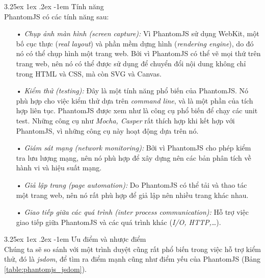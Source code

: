 \documentclass[12pt,a4paper,twoside]{article}
\makeatletter
\newcommand{\myparagraph}[1]{\paragraph{#1}\mbox{}\\} %
\renewcommand\paragraph{\@startsection{paragraph}{5}{\z@}%
  {3.25ex \@plus1ex \@minus.2ex}%
  {-1em}%
  {\normalfont\normalsize\bfseries}}
\makeatother
\begin{document}
\myparagraph{Tính năng}
PhantomJS có các tính năng sau:
\begin{itemize}
\item[•] \emph{Chụp ảnh màn hình (screen capture):} Vì PhantomJS sử dụng WebKit, một bố cục thực (\textit{real layout}) và phần mềm dựng hình (\textit{rendering engine}), do đó nó có thể chụp hình một trang web. Bởi vì PhantomJS có thể vẽ mọi thứ trên trang web, nên nó có thể được sử dụng để chuyển đổi nội dung không chỉ trong HTML và CSS, mà còn SVG và Canvas.
\item[•] \emph{Kiểm thử (testing):} Đây là một tính năng phổ biến của PhantomJS. Nó phù hợp cho việc kiểm thử dựa trên \textit{command line}, và là một phần của tích hợp liên tục. PhantomJS được xem như là công cụ phổ biến để chạy các unit test. Những công cụ như \textit{Mocha, Casper} rất thích hợp khi kết hợp với PhantomJS, vì những công cụ này hoạt động dựa trên nó.
\item[•] \emph{Giám sát mạng (network monitoring):} Bởi vì PhantomJS cho phép kiểm tra lưu lượng mạng, nên nó phù hợp để xây dựng nên các bản phân tích về hành vi và hiệu suất mạng.
\item[•] \emph{Giả lập trang (page automation):} Do PhantomJS có thể tải và thao tác một trang web, nên nó rất phù hợp để giả lập nên nhiều trang khác nhau.
\item[•] \emph{Giao tiếp giữa các quá trình (inter process communication):} Hỗ trợ việc giao tiếp giữa PhantomJS và các quá trình khác (\textit{I/O, HTTP,…}).
\end{itemize}

\myparagraph{Ưu điểm và nhược điểm}
Chúng ta sẽ so sánh\cite{jsdom_phantomjs} với một trình duyệt cũng rất phổ biến trong việc hỗ trợ kiểm thử, đó là \textit{jsdom}, để tìm ra điểm mạnh cũng như điểm yếu của PhantomJS (Bảng \ref{table:phantomjs_jsdom}).
\end{document}
